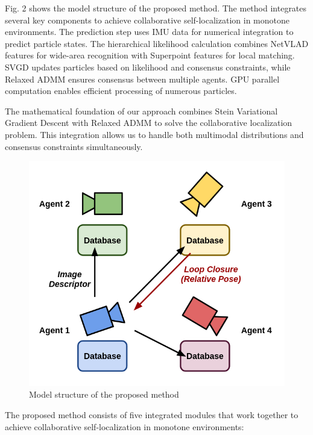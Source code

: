 \documentclass[a4paper,fleqn,10pt,twocolumn]{SICE_ISCS}
\begin{document}
Fig. 2 shows the model structure of the proposed method. The method integrates several key components to achieve collaborative self-localization in monotone environments. The prediction step uses IMU data for numerical integration to predict particle states. The hierarchical likelihood calculation combines NetVLAD features for wide-area recognition with Superpoint features for local matching. SVGD updates particles based on likelihood and consensus constraints, while Relaxed ADMM ensures consensus between multiple agents. GPU parallel computation enables efficient processing of numerous particles.

The mathematical foundation of our approach combines Stein Variational Gradient Descent with Relaxed ADMM to solve the collaborative localization problem. This integration allows us to handle both multimodal distributions and consensus constraints simultaneously.

\begin{figure}[t]
	\begin{center}
		\includegraphics[width=\linewidth]{Fig/simple_model.png}
		\caption{Model structure of the proposed method}
		\label{fig:model}
	\end{center}
	\vspace{-2mm}
\end{figure}

The proposed method consists of five integrated modules that work together to achieve collaborative self-localization in monotone environments:
\end{document}
